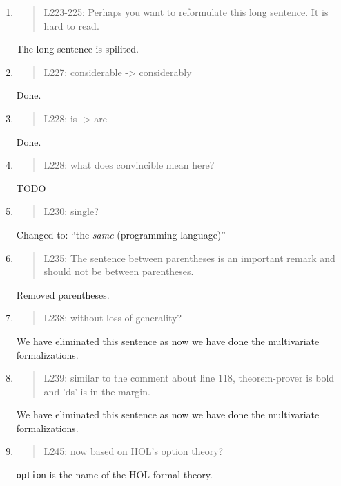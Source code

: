 \begin{enumerate}
\item \begin{quote}
    L223-225: Perhaps you want to reformulate this long sentence. It is hard to read.
  \end{quote}
  The long sentence is spilited.
  
\item \begin{quote}
    L227: considerable -> considerably
  \end{quote}
  Done.
 
\item \begin{quote}
    L228: is -> are
  \end{quote}
  Done.
  
\item \begin{quote}
    L228: what does convincible mean here?
  \end{quote}
  TODO
  
\item \begin{quote}
    L230: single?
  \end{quote}
  Changed to: ``the \emph{same} (programming language)''
  
\item \begin{quote}
    L235: The sentence between parentheses is an important remark and
    should not be between parentheses.
  \end{quote}
  Removed parentheses.
  
\item \begin{quote}
    L238: without loss of generality?
  \end{quote}
  We have eliminated this sentence as now we have done the
  multivariate formalizations.
  
\item \begin{quote}
    L239: similar to the comment about line 118, theorem-prover is
    bold and 'ds' is in the margin.
  \end{quote}
  We have eliminated this sentence as now we have done the
  multivariate formalizations.
  
\item \begin{quote}
    L245: now based on HOL’s option theory?
  \end{quote}
  \texttt{option} is the name of the HOL formal theory.
  

\end{enumerate}
